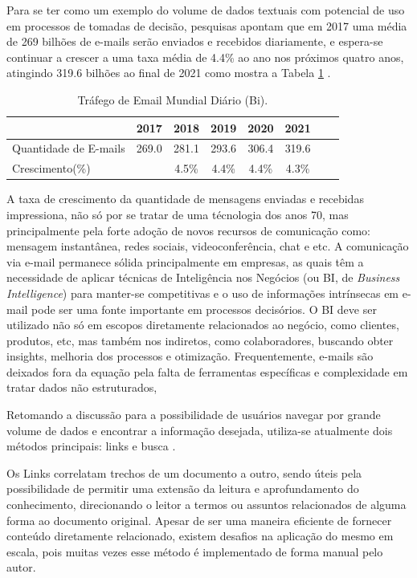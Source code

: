 \documentclass[12pt,a4paper]{article}
\begin{document}
 Para se ter como um exemplo do volume de dados textuais com potencial de uso em processos de tomadas de decisão, pesquisas apontam que em 2017 uma média de 269 bilhões de e-mails serão enviados e recebidos diariamente, e espera-se continuar a crescer a uma taxa média de 4.4\% ao ano nos próximos quatro anos, atingindo 319.6 bilhões ao final de 2021 como mostra a Tabela \ref{tb_email} \cite{radicati2017}.

\begin{table}[H]
  \centering
  \begin{tabular}{l*{6}{c}r}
  &					2017 &	2018 &	2019 &	2020 &	2021 & \\
  \hline
  Quantidade de E-mails &			269.0 &	281.1 &	293.6 &	306.4 &	319.6 & \\
  Crescimento(\%) &  	&		4.5\% &	4.4\% &	4.4\% &	4.3\% & \\
  \hline
  \end{tabular}
  \caption{Tráfego de Email Mundial Diário  (Bi). \cite{radicati2017}}
  \label{tb_email}
\end{table}

A taxa de crescimento da quantidade de mensagens enviadas e recebidas impressiona, não só por se tratar de uma técnologia dos anos 70,
mas principalmente pela forte adoção de novos recursos de comunicação como: mensagem instantânea, redes sociais, videoconferência, chat e etc. A comunicação via e-mail permanece sólida principalmente em empresas, as quais têm a necessidade de aplicar técnicas de Inteligência nos Negócios (ou BI, de \textit{Business Intelligence}) para manter-se competitivas e o uso de informações intrínsecas em e-mail pode ser uma fonte importante em processos decisórios. O BI deve ser utilizado não só em escopos diretamente relacionados ao negócio,
como clientes, produtos, etc, mas também nos indiretos, como colaboradores, buscando obter insights, melhoria dos processos e otimização.
Frequentemente, e-mails são deixados fora da equação pela falta de ferramentas específicas e complexidade em tratar dados não estruturados,
 
 
 Retomando a discussão para a possibilidade de usuários navegar por grande volume de dados e encontrar a informação desejada, utiliza-se atualmente dois métodos principais:
 links e busca  \cite{blei2012probabilistic}. 
 
 Os Links correlatam trechos de um documento a outro, sendo úteis pela possibilidade de permitir uma extensão da leitura e aprofundamento do conhecimento,
 direcionando o leitor a termos ou assuntos relacionados de alguma forma ao documento original. Apesar de ser uma maneira eficiente de fornecer conteúdo diretamente relacionado,
 existem desafios na aplicação do mesmo em escala, pois muitas vezes esse método é implementado de forma manual pelo autor. 
 
\end{document}
